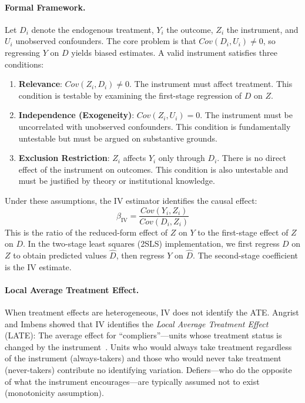 \paragraph{Formal Framework.}
Let $D_i$ denote the endogenous treatment, $Y_i$ the outcome, $Z_i$ the instrument, and $U_i$ unobserved confounders.
The core problem is that $Cov(D_i, U_i) \neq 0$, so regressing $Y$ on $D$ yields biased estimates.
A valid instrument satisfies three conditions:
\begin{enumerate}[leftmargin=15pt]
    \item \textbf{Relevance}: $Cov(Z_i, D_i) \neq 0$.
    The instrument must affect treatment.
    This condition is testable by examining the first-stage regression of $D$ on $Z$.
    
    \item \textbf{Independence (Exogeneity)}: $Cov(Z_i, U_i) = 0$.
    The instrument must be uncorrelated with unobserved confounders.
    This condition is fundamentally untestable but must be argued on substantive grounds.
    
    \item \textbf{Exclusion Restriction}: $Z_i$ affects $Y_i$ only through $D_i$.
    There is no direct effect of the instrument on outcomes.
    This condition is also untestable and must be justified by theory or institutional knowledge.
\end{enumerate}

Under these assumptions, the IV estimator identifies the causal effect:
\begin{equation}
    \beta_{\text{IV}} = \frac{Cov(Y_i, Z_i)}{Cov(D_i, Z_i)}
\end{equation}
This is the ratio of the reduced-form effect of $Z$ on $Y$ to the first-stage effect of $Z$ on $D$.
In the two-stage least squares (2SLS) implementation, we first regress $D$ on $Z$ to obtain predicted values $\hat{D}$, then regress $Y$ on $\hat{D}$.
The second-stage coefficient is the IV estimate.

\paragraph{Local Average Treatment Effect.}
When treatment effects are heterogeneous, IV does not identify the ATE.
Angrist and Imbens showed that IV identifies the \emph{Local Average Treatment Effect} (LATE): The average effect for ``compliers''---units whose treatment status is changed by the instrument~\cite{angrist1996identification}.
Units who would always take treatment regardless of the instrument (always-takers) and those who would never take treatment (never-takers) contribute no identifying variation.
Defiers---who do the opposite of what the instrument encourages---are typically assumed not to exist (monotonicity assumption).

